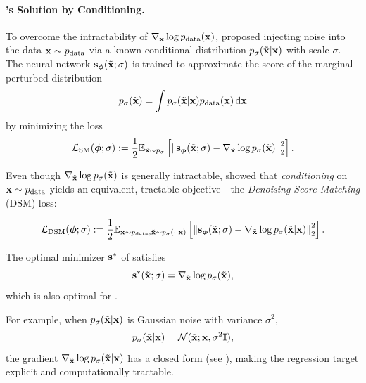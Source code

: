 \paragraph{\citet{vincent2011connection}'s Solution by Conditioning.}
To overcome the intractability of $\nabla_{{\mathbf{x}}} \log p_{\text{data}}({\mathbf{x}})$, \citet{vincent2011connection} proposed injecting noise into the data ${\mathbf{x}} \sim p_{\text{data}}$ via a known conditional distribution $p_{\sigma}(\tilde{{\mathbf{x}}}|{\mathbf{x}})$ with scale $\sigma$. The neural network ${\mathbf{s}}_{\bm{\phi}}(\tilde{{\mathbf{x}}}; \sigma)$ is trained to approximate the score of the marginal perturbed distribution
\[
p_\sigma(\tilde{{\mathbf{x}}}) = \int p_{\sigma}(\tilde{{\mathbf{x}}}|{\mathbf{x}}) p_{\text{data}}({\mathbf{x}}) \mathop{}\!\mathrm{d} {\mathbf{x}}
\]
by minimizing the loss
\begin{align}\label{eq:sm-noise-loss}
\mathcal{L}_{\text{SM}}(\bm{\phi}; \sigma) := \frac{1}{2} \mathbb{E}_{\tilde{{\mathbf{x}}} \sim p_\sigma} \left[ \left\lVert{\mathbf{s}}_{\bm{\phi}}(\tilde{{\mathbf{x}}}; \sigma) - \nabla_{\tilde{{\mathbf{x}}}} \log p_\sigma(\tilde{{\mathbf{x}}})\right\rVert_2^2 \right].
\end{align}

Even though $\nabla_{\tilde{{\mathbf{x}}}} \log p_\sigma(\tilde{{\mathbf{x}}})$ is generally intractable, \citet{vincent2011connection} showed that \emph{conditioning} on ${\mathbf{x}} \sim p_{\text{data}}$ yields an equivalent, tractable objective—the \emph{Denoising Score Matching} (DSM) loss:
\begin{mdframed}
\begin{align}\label{eq:dsm-loss}
\mathcal{L}_{\text{DSM}}(\bm{\phi}; \sigma) := \frac{1}{2} \mathbb{E}_{{\mathbf{x}} \sim p_{\text{data}}, \tilde{{\mathbf{x}}} \sim p_{\sigma}(\cdot|{\mathbf{x}})} \left[ \left\lVert{\mathbf{s}}_{\bm{\phi}}(\tilde{{\mathbf{x}}}; \sigma) - \nabla_{\tilde{{\mathbf{x}}}} \log p_{\sigma}(\tilde{{\mathbf{x}}}|{\mathbf{x}})\right\rVert_2^2 \right].
\end{align}
\end{mdframed}

The optimal minimizer ${\mathbf{s}}^*$ of  satisfies
\[
{\mathbf{s}}^*(\tilde{{\mathbf{x}}}; \sigma) = \nabla_{\tilde{{\mathbf{x}}}} \log p_\sigma(\tilde{{\mathbf{x}}}),
\]
which is also optimal for .

For example, when $p_{\sigma}(\tilde{{\mathbf{x}}}|{\mathbf{x}})$ is Gaussian noise with variance $\sigma^2$,
\[
p_{\sigma}(\tilde{{\mathbf{x}}}|{\mathbf{x}}) = \mathcal{N}(\tilde{{\mathbf{x}}}; {\mathbf{x}}, \sigma^2 \mathbf{I}),
\]
the gradient $\nabla_{\tilde{{\mathbf{x}}}} \log p_{\sigma}(\tilde{{\mathbf{x}}}|{\mathbf{x}})$ has a closed form (see ), making the regression target explicit and computationally tractable.

